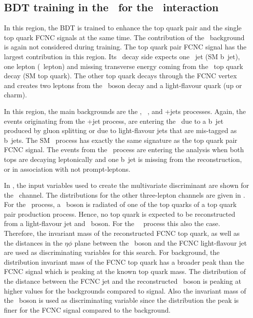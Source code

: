 \clearpage
\subsection{BDT training in the \TTSR\ for the \Zut\ interaction}
\label{sec:BDTTTSRZUT}
In this region, the BDT is trained to enhance the top quark pair and the single top quark FCNC signals at the same time. The contribution of the \NPL\ background is again not considered during training. The top quark pair FCNC signal has the largest contribution in this region. Its \SM\ decay side expects one \Pbottom\ jet (SM b~jet), one lepton (\PW\ lepton) and missing transverse energy coming from the \SM\ top quark decay (SM top quark). The other top quark decays through the FCNC vertex and creates two leptons from the \PZ\ boson decay and a light-flavour quark (up or charm). 

In this region, the main backgrounds are the \ttZ, \SM\ \tZq, and \WZ+jets processes. Again, the events originating from the \WZ+jet process, are entering the \STSR\ due to a b~jet produced by gluon splitting or due to light-flavour jets that are mis-tagged as b~jets.  The SM \tZq\ process has exactly the same signature as the top quark pair FCNC signal.  The events from the \ttZ\ process are entering the analysis when both tops are decaying leptonically and one b~jet is missing from the reconstruction, or in association with not prompt-leptons. 


  In , the input variables used to create the multivariate discriminant are shown for the \mumumu\ channel. The distributions for the other three-lepton channels are given in . For the \ttZ\ process, a \PZ\ boson is radiated of one of the top quarks of a top quark pair production process. Hence, no top quark is expected to be reconstructed from a light-flavour jet and \PZ\ boson. For the \SM\ \tZq\ process this also the case. Therefore, the invariant mass of the reconstructed FCNC top quark, as well as the distances in the $\eta\phi$ plane between the \PZ\ boson and the FCNC light-flavour jet are used as discriminating variables for this search. For background, the distribution invariant mass of the FCNC top quark has a broader peak than the FCNC signal which is peaking at the known top quark mass. The distribution of the distance between the FCNC jet and the reconstructed \PZ\ boson is peaking at higher values for the backgrounds compared to signal. Also the invariant mass of the \PZ\ boson is used as discriminating variable since the distribution the peak is finer for the FCNC signal compared to the background. 
  

